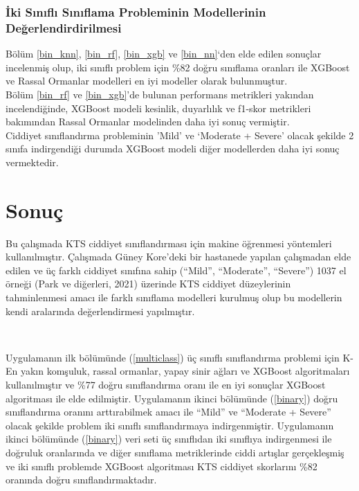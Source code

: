 \documentclass[12pt,twoside]{deuthesis}
\begin{document}
\hypertarget{iki-sux131nux131flux131-sux131nux131flama-probleminin-modellerinin-deux11ferlendirdirilmesi}{%
\subsection{İki Sınıflı Sınıflama Probleminin Modellerinin Değerlendirdirilmesi}\label{iki-sux131nux131flux131-sux131nux131flama-probleminin-modellerinin-deux11ferlendirdirilmesi}}

Bölüm \ref{bin_knn}, \ref{bin_rf}, \ref{bin_xgb} ve \ref{bin_nn}`den elde edilen sonuçlar incelenmiş olup, iki sınıflı problem için \%82 doğru sınıflama oranları ile XGBoost ve Rassal Ormanlar modelleri en iyi modeller olarak bulunmuştur.\\
Bölüm \ref{bin_rf} ve \ref{bin_xgb}'de bulunan performans metrikleri yakından incelendiğinde, XGBoost modeli kesinlik, duyarlılık ve f1-skor metrikleri bakımından Rassal Ormanlar modelinden daha iyi sonuç vermiştir.\\
Ciddiyet sınıflandırma probleminin 'Mild' ve `Moderate + Severe' olacak şekilde 2 sınıfa indirgendiği durumda XGBoost modeli diğer modellerden daha iyi sonuç vermektedir.

\hypertarget{sonuuxe7}{%
\chapter*{Sonuç}\label{sonuuxe7}}

Bu çalışmada KTS ciddiyet sınıflandırması için makine öğrenmesi yöntemleri kullanılmıştır. Çalışmada Güney Kore'deki bir hastanede yapılan çalışmadan elde edilen ve üç farklı ciddiyet sınıfına sahip (``Mild'', ``Moderate'', ``Severe'') 1037 el örneği (Park ve diğerleri, 2021) üzerinde KTS ciddiyet düzeylerinin tahminlenmesi amacı ile farklı sınıflama modelleri kurulmuş olup bu modellerin kendi aralarında değerlendirmesi yapılmıştır.

~

Uygulamanın ilk bölümünde (\ref{multiclass}) üç sınıflı sınıflandırma problemi için K-En yakın komşuluk, rassal ormanlar, yapay sinir ağları ve XGBoost algoritmaları kullanılmıştır ve \%77 doğru sınıflandırma oranı ile en iyi sonuçlar XGBoost algoritması ile elde edilmiştir. Uygulamanın ikinci bölümünde (\ref{binary}) doğru sınıflandırma oranını arttırabilmek amacı ile ``Mild'' ve ``Moderate + Severe'' olacak şekilde problem iki sınıflı sınıflandırmaya indirgenmiştir. Uygulamanın ikinci bölümünde (\ref{binary}) veri seti üç sınıflıdan iki sınıflıya indirgenmesi ile doğruluk oranlarında ve diğer sınıflama metriklerinde ciddi artışlar gerçekleşmiş ve iki sınıflı problemde XGBoost algoritması KTS ciddiyet skorlarını \%82 oranında doğru sınıflandırmaktadır.
\end{document}
